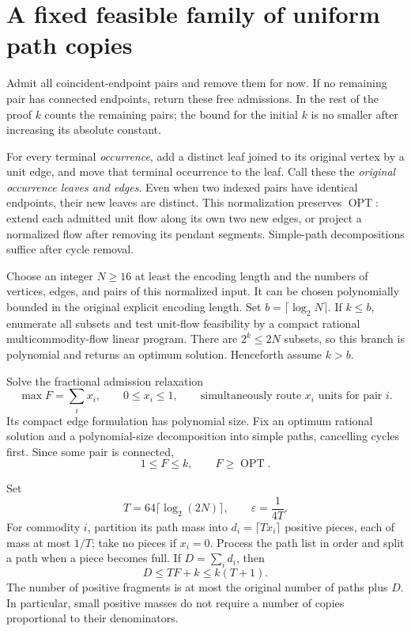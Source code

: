\documentclass[acmsmall,11pt,screen,nonacm]{acmart}
\newcommand{\OPT}{\operatorname{OPT}}
\begin{document}
\section{A fixed feasible family of uniform path copies}\label{sec:copies}

Admit all coincident-endpoint pairs and remove them for now. If no remaining
pair has connected endpoints, return these free admissions. In the rest of
the proof $k$ counts the remaining pairs; the bound for the initial $k$ is
no smaller after increasing its absolute constant.

For every terminal \emph{occurrence}, add a distinct leaf joined to its
original vertex by a unit edge, and move that terminal occurrence to the
leaf. Call these the \emph{original occurrence leaves and edges}. Even when
two indexed pairs have identical endpoints, their new leaves are distinct.
This normalization preserves $\OPT$: extend each admitted unit flow along
its own two new edges, or project a normalized flow after removing its
pendant segments. Simple-path decompositions suffice after cycle removal.

Choose an integer $N\ge16$ at least the encoding length and the numbers of
vertices, edges, and pairs of this normalized input. It can be chosen
polynomially bounded in the original explicit encoding length. Set
$b=\lceil\log_2N\rceil$. If $k\le b$, enumerate all subsets and test unit-flow
feasibility by a compact rational multicommodity-flow linear program.
There are $2^k\le2N$ subsets, so this branch is polynomial and returns an
optimum solution. Henceforth assume $k>b$.

Solve the fractional admission relaxation
\[
 \max F=\sum_i x_i,\qquad 0\le x_i\le1,
 \qquad \text{simultaneously route $x_i$ units for pair $i$}.
\]
Its compact edge formulation has polynomial size. Fix an optimum rational
solution and a polynomial-size decomposition into simple paths, cancelling
cycles first. Since some pair is connected,
\begin{equation}\label{eq:F}
 1\le F\le k,\qquad F\ge\OPT.
\end{equation}

Set
\begin{equation}\label{eq:scale}
 T=64\lceil\log_2(2N)\rceil,\qquad \varepsilon=\frac1{4T}.
\end{equation}
For commodity $i$, partition its path mass into
$d_i=\lceil Tx_i\rceil$ positive pieces, each of mass at most $1/T$;
take no pieces if $x_i=0$. Process the path list in order and split a path
when a piece becomes full. If $D=\sum_i d_i$, then
\begin{equation}\label{eq:pieces}
 D\le TF+k\le k(T+1).
\end{equation}
The number of positive fragments is at most the original number of paths
plus $D$. In particular, small positive masses do not require a number of
copies proportional to their denominators.
\end{document}
